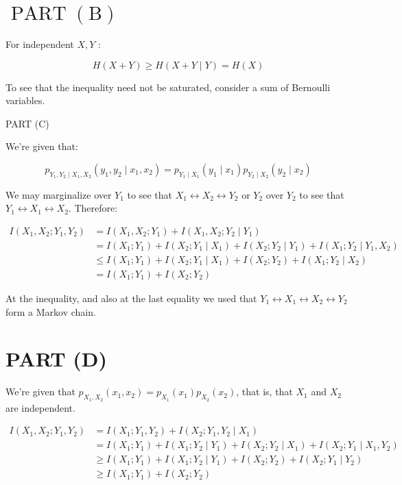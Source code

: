 \documentclass[10pt]{article}
\begin{document}
\section*{$\operatorname{PART}(\mathrm{B})$}
For independent $X, Y$ :

$$
H(X+Y) \geq H(X+Y \mid Y)=H(X)
$$

To see that the inequality need not be saturated, consider a sum of Bernoulli variables.

PART (C)

We're given that:

$$
p_{Y_{1}, Y_{2} \mid X_{1}, X_{2}}\left(y_{1}, y_{2} \mid x_{1}, x_{2}\right)=p_{Y_{1} \mid X_{1}}\left(y_{1} \mid x_{1}\right) p_{Y_{2} \mid X_{2}}\left(y_{2} \mid x_{2}\right)
$$

We may marginalize over $Y_{1}$ to see that $X_{1} \leftrightarrow X_{2} \leftrightarrow Y_{2}$ or $Y_{2}$ over $Y_{2}$ to see that $Y_{1} \leftrightarrow X_{1} \leftrightarrow X_{2}$. Therefore:

$$
\begin{aligned}
I\left(X_{1}, X_{2} ; Y_{1}, Y_{2}\right) & =I\left(X_{1}, X_{2} ; Y_{1}\right)+I\left(X_{1}, X_{2} ; Y_{2} \mid Y_{1}\right) \\
& =I\left(X_{1} ; Y_{1}\right)+I\left(X_{2} ; Y_{1} \mid X_{1}\right)+I\left(X_{2} ; Y_{2} \mid Y_{1}\right)+I\left(X_{1} ; Y_{2} \mid Y_{1}, X_{2}\right) \\
& \leq I\left(X_{1} ; Y_{1}\right)+I\left(X_{2} ; Y_{1} \mid X_{1}\right)+I\left(X_{2} ; Y_{2}\right)+I\left(X_{1} ; Y_{2} \mid X_{2}\right) \\
& =I\left(X_{1} ; Y_{1}\right)+I\left(X_{2} ; Y_{2}\right)
\end{aligned}
$$

At the inequality, and also at the last equality we used that $Y_{1} \leftrightarrow X_{1} \leftrightarrow X_{2} \leftrightarrow Y_{2}$ form a Markov chain.

\section*{PART (D)}
We're given that $p_{X_{1}, X_{2}}\left(x_{1}, x_{2}\right)=p_{X_{1}}\left(x_{1}\right) p_{X_{2}}\left(x_{2}\right)$, that is, that $X_{1}$ and $X_{2}$ are independent.

$$
\begin{aligned}
I\left(X_{1}, X_{2} ; Y_{1}, Y_{2}\right) & =I\left(X_{1} ; Y_{1}, Y_{2}\right)+I\left(X_{2} ; Y_{1}, Y_{2} \mid X_{1}\right) \\
& =I\left(X_{1} ; Y_{1}\right)+I\left(X_{1} ; Y_{2} \mid Y_{1}\right)+I\left(X_{2} ; Y_{2} \mid X_{1}\right)+I\left(X_{2} ; Y_{1} \mid X_{1}, Y_{2}\right) \\
& \geq I\left(X_{1} ; Y_{1}\right)+I\left(X_{1} ; Y_{2} \mid Y_{1}\right)+I\left(X_{2} ; Y_{2}\right)+I\left(X_{2} ; Y_{1} \mid Y_{2}\right) \\
& \geq I\left(X_{1} ; Y_{1}\right)+I\left(X_{2} ; Y_{2}\right)
\end{aligned}
$$
\end{document}
